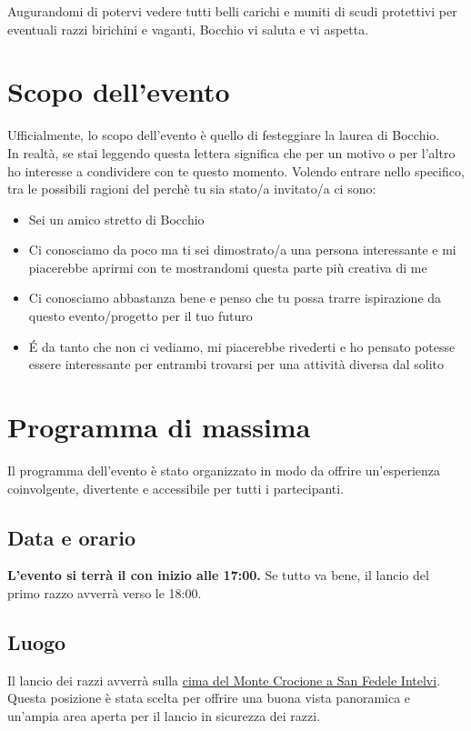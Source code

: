 \documentclass[12pt, a4paper]{article}
\begin{document}
Augurandomi di potervi vedere tutti belli carichi e muniti di scudi protettivi per eventuali razzi birichini e vaganti, Bocchio vi saluta e vi aspetta.


\clearpage
\newpage
\setlength{\parindent}{1em}
\setlength{\parskip}{1pt}


\section{Scopo dell'evento}

Ufficialmente, lo scopo dell'evento è quello di festeggiare la laurea di Bocchio. \\
In realtà, se stai leggendo questa lettera significa che per un motivo o per l'altro ho interesse a condividere con te questo momento.
Volendo entrare nello specifico, tra le possibili ragioni del perchè tu sia stato/a invitato/a ci sono:
\begin{itemize}
    \item Sei un amico stretto di Bocchio
    \item Ci conosciamo da poco ma ti sei dimostrato/a una persona interessante e mi piacerebbe aprirmi con te mostrandomi questa parte più creativa di me
    \item Ci conosciamo abbastanza bene e penso che tu possa trarre ispirazione da questo evento/progetto per il tuo futuro
    \item É da tanto che non ci vediamo, mi piacerebbe rivederti e ho pensato potesse essere interessante per entrambi trovarsi per una attività diversa dal solito
\end{itemize}


\section{Programma di massima}

Il programma dell'evento è stato organizzato in modo da offrire un'esperienza coinvolgente, divertente e accessibile per tutti i partecipanti.

\subsection*{Data e orario}
\textbf{L'evento si terrà il  con inizio alle 17:00.} Se tutto va bene, il lancio del primo razzo avverrà verso le 18:00.

\subsection*{Luogo}
Il lancio dei razzi avverrà sulla \href{https://goo.gl/maps/K2kVRpBknDxLTATeA}{cima del Monte Crocione a San Fedele Intelvi}.
Questa posizione è stata scelta per offrire una buona vista panoramica e un'ampia area aperta per il lancio in sicurezza dei razzi.
\end{document}
